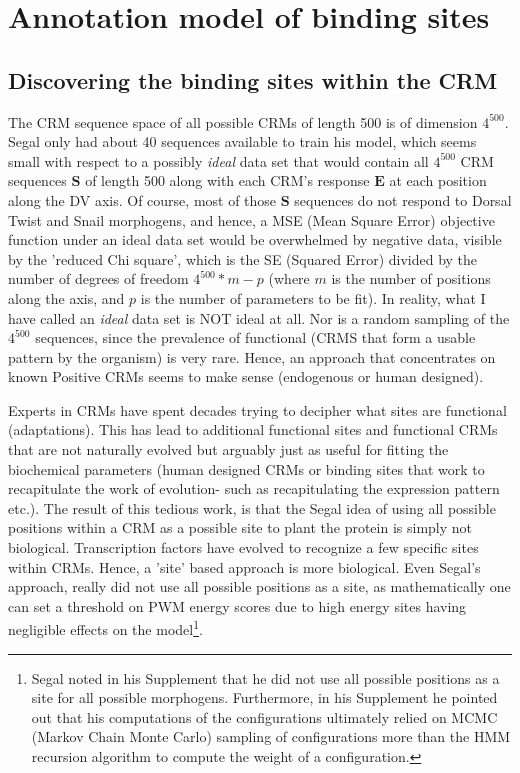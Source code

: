   
  \section{Annotation model of binding sites}
\subsection{Discovering the binding sites within the CRM}
The CRM sequence space of all possible CRMs of length 500 is of dimension $4^{500}$.  Segal only had about 40 sequences available to train his model, which seems small with respect to a possibly \emph{ideal} data set that would contain all $4^{500}$ CRM sequences $\textbf{S}$ of length 500 along with each CRM's response $\textbf{E}$ at each position along the DV axis.  Of course, most of those $\textbf{S}$ sequences do not respond to Dorsal Twist and Snail morphogens, and hence, a MSE (Mean Square Error) objective function under an ideal data set would be overwhelmed by negative data, visible by the 'reduced Chi square', which  is the SE (Squared Error) divided by the number of degrees of freedom $4^{500} * m - p$ (where $m$ is the number of positions along the axis, and $p$ is the number of parameters to be fit).  In reality, what I have called an \emph{ideal} data set is NOT ideal at all.  Nor is a random sampling of the $4^{500}$ sequences, since the prevalence of functional (CRMS that form a usable pattern by the organism) is very rare.  Hence, an approach that concentrates on known Positive CRMs seems to make sense (endogenous or human designed).

Experts in CRMs have spent decades trying to decipher what sites are functional (adaptations).  This has lead to additional functional sites and functional CRMs that are not naturally evolved but arguably just as useful for fitting the biochemical parameters (human designed CRMs or binding sites that work to recapitulate the work of evolution- such as recapitulating the expression pattern etc.). The result of this tedious work, is that the Segal idea of using all possible positions within a CRM as a possible site to plant the protein is simply not biological.  Transcription factors have evolved to recognize a few specific sites within CRMs.  Hence, a 'site' based approach is more biological.  Even Segal's approach, really did not use all possible positions as a site, as mathematically one can set a threshold on PWM energy scores due to high energy sites having negligible effects on the model\footnote{Segal noted in his Supplement that he did not use all possible positions as a site for all possible morphogens.  Furthermore, in his Supplement he pointed out that his computations of the configurations ultimately relied on MCMC (Markov Chain Monte Carlo) sampling of configurations more than the HMM recursion algorithm to compute the weight of a configuration.}.  


